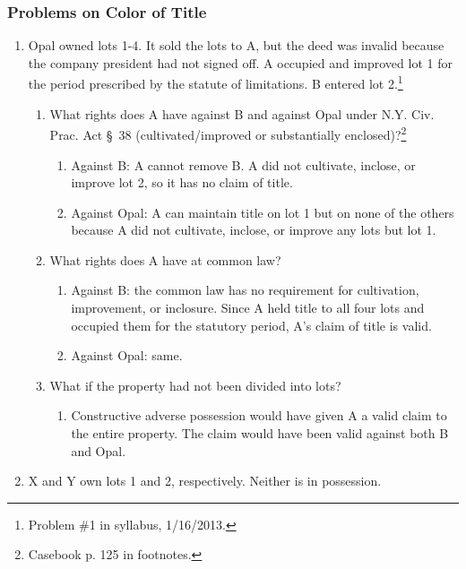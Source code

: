 \subsubsection{Problems on Color of Title}

\begin{enumerate}
    \item Opal owned lots 1-4. It sold the lots to A, but the deed was invalid 
    because the company president had not signed off. A occupied and improved 
    lot 1 for the period prescribed by the statute of limitations. B entered 
    lot 2.\footnote{Problem \#1 in syllabus, 1/16/2013.}
    \begin{enumerate}
        \item What rights does A have against B and against Opal under N.Y. 
        Civ. Prac. Act \S\ 38 (cultivated/improved or substantially 
        enclosed)?\footnote{Casebook p. 125 in footnotes.}
        \begin{enumerate}
            \item Against B: A cannot remove B. A did not cultivate, inclose, 
            or improve lot 2, so it has no claim of title.
            \item Against Opal: A can maintain title on lot 1 but on none of 
            the others because A did not cultivate, inclose, or improve any 
            lots but lot 1.
        \end{enumerate}
        \item What rights does A have at common law?
        \begin{enumerate}
            \item Against B: the common law has no requirement for 
            cultivation, improvement, or inclosure. Since A held title to all 
            four lots and occupied them for the statutory period, A's claim of 
            title is valid.
            \item Against Opal: same.
        \end{enumerate}
        \item What if the property had not been divided into lots?
        \begin{enumerate}
            \item Constructive adverse possession would have given A a valid 
            claim to the entire property. The claim would have been valid 
            against both B and Opal.
        \end{enumerate}
    \end{enumerate}
    \item X and Y own lots 1 and 2, respectively. Neither is in possession. 

\end{enumerate}
